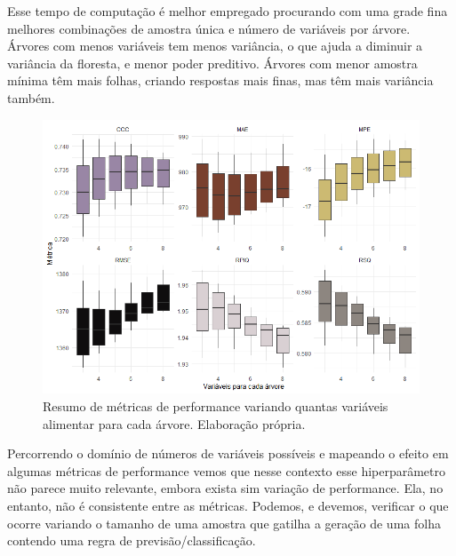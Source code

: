 Esse tempo de computação é melhor empregado procurando com uma grade fina melhores combinações de amostra única e número de variáveis por árvore. Árvores com menos variáveis tem menos variância, o que ajuda a diminuir a variância da floresta, e menor poder preditivo. Árvores com menor amostra mínima têm mais folhas, criando respostas mais finas, mas têm mais variância também. 


\begin{figure}[H]
    \centering
    \includegraphics[scale = .72]{imagens/cross_v_mtry.png}
    \caption{Resumo de métricas de performance variando quantas variáveis alimentar para cada árvore. Elaboração própria.}
\end{figure}

Percorrendo o domínio de números de variáveis possíveis e mapeando o efeito em algumas métricas de performance vemos que nesse contexto esse hiperparâmetro não parece muito relevante, embora exista sim variação de performance. Ela, no entanto, não é consistente entre as métricas. Podemos, e devemos, verificar o que ocorre variando o tamanho de uma amostra que gatilha a geração de uma folha contendo uma regra de previsão/classificação. 


